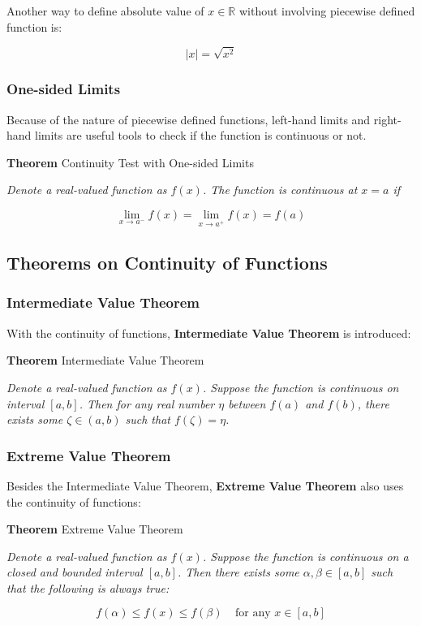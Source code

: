 \documentclass[a4paper,12pt]{article}
\newcommand{\n}{\vspace{3mm}}
\newcommand{\R}{\mathbb{R}}
\newenvironment{block}[4][Block]{ %
\begin{list}{}{
  \setlength{\leftmargin}{0mm}
  \setlength{\rightmargin}{0mm}
  \setlength{\topsep}{0mm}
  \setlength{\partopsep}{0mm}
  \parsep\parskip
  \setlength{\itemsep}{-\parsep}
  }
  \needspace{\baselineskip}
  \item \textbf{#2 #3} \hspace{1mm} #4
  \vspace{1mm}
  \item
  }
{
\end{list}
}
\begin{document}
Another way to define absolute value of $x\in \R$ without involving piecewise defined function is:

$$\left| x\right| =\sqrt{x^{2}}$$

\subsubsection{One-sided Limits}
Because of the nature of piecewise defined functions, left-hand limits and right-hand limits are useful tools to check if the function is continuous or not.\n

\begin{block}{Theorem}{}{Continuity Test with One-sided Limits}
  \textit{Denote a real-valued function as $f(x)$. The function is continuous at $x=a$ if}

  $$\lim_{x\to a^{-}}f(x)=\lim_{x\to a^{+}}f(x)=f(a)$$

\end{block}\n

\subsection{Theorems on Continuity of Functions}
\subsubsection{Intermediate Value Theorem}
With the continuity of functions, \textbf{Intermediate Value Theorem} is introduced:\n

\begin{block}{Theorem}{}{Intermediate Value Theorem}
  \textit{Denote a real-valued function as $f(x)$. Suppose the function is continuous on interval $[a,b]$. Then for any real number $\eta$ between $f(a)$ and $f(b)$, there exists some $\zeta\in (a,b)$ such that $f(\zeta)=\eta$.}
\end{block}

\subsubsection{Extreme Value Theorem}
Besides the Intermediate Value Theorem, \textbf{Extreme Value Theorem} also uses the continuity of functions:\n

\begin{block}{Theorem}{}{Extreme Value Theorem}
  \textit{Denote a real-valued function as $f(x)$. Suppose the function is continuous on a closed and bounded interval $[a,b]$. Then there exists some $\alpha,\beta\in [a,b]$ such that the following is always true:}

  $$f(\alpha)\leq f(x)\leq f(\beta)\;\;\;\;\text{for any }x\in [a,b]$$

\end{block}
\end{document}
